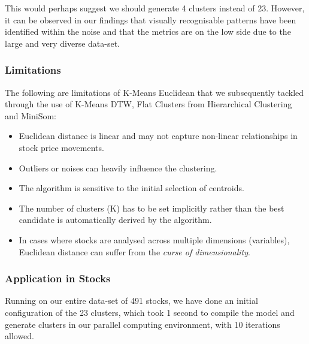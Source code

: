 \documentclass[11pt]{article}
\begin{document}
This would perhaps suggest we should generate 4 clusters instead of 23. However, it can be observed in our findings that visually recognisable patterns have been identified within the noise and that the metrics are on the low side due to the large and very diverse data-set.

\subsubsection{Limitations}

The following are limitations of K-Means Euclidean that we subsequently tackled through the use of K-Means DTW, Flat Clusters from Hierarchical Clustering and MiniSom:

\begin{itemize}
    \item Euclidean distance is linear and may not capture non-linear relationships in stock price movements.
    \item Outliers or noises can heavily influence the clustering.
    \item The algorithm is sensitive to the initial selection of centroids.
    \item The number of clusters (K) has to be set implicitly rather than the best candidate is automatically derived by the algorithm.
    \item In cases where stocks are analysed across multiple dimensions (variables), Euclidean distance can suffer from the \textit{curse of dimensionality}.

      
\end{itemize}

\subsubsection{Application in Stocks}
\label{sec:stockskmeanseuclidean}

Running on our entire data-set of 491 stocks, we have done an initial configuration of the 23 clusters, which took 1 second to compile the model and generate clusters in our parallel computing environment, with 10 iterations allowed. 
\end{document}
